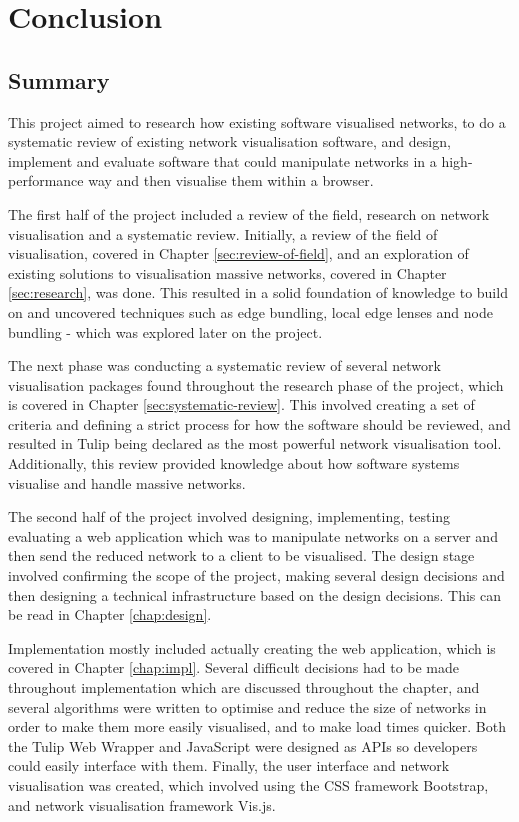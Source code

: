 \documentclass[../dissertation.tex]{subfiles}
\begin{document}
\chapter{Conclusion}

\section{Summary}

This project aimed to research how existing software visualised networks, to do a systematic review of existing network visualisation software, and design, implement and evaluate software that could manipulate networks in a high-performance way and then visualise them within a browser. 

The first half of the project included a review of the field, research on network visualisation and a systematic review. Initially, a review of the field of visualisation, covered in Chapter \ref{sec:review-of-field}, and an exploration of existing solutions to visualisation massive networks, covered in Chapter \ref{sec:research}, was done. This resulted in a solid foundation of knowledge to build on and uncovered techniques such as edge bundling, local edge lenses and node bundling - which was explored later on the project.

The next phase was conducting a systematic review of several network visualisation packages found throughout the research phase of the project, which is covered in Chapter \ref{sec:systematic-review}. This involved creating a set of criteria and defining a strict process for how the software should be reviewed, and resulted in Tulip being declared as the most powerful network visualisation tool. Additionally, this review provided knowledge about how software systems visualise and handle massive networks.

The second half of the project involved designing, implementing, testing evaluating a web application which was to manipulate networks on a server and then send the reduced network to a client to be visualised. The design stage involved confirming the scope of the project, making several design decisions and then designing a technical infrastructure based on the design decisions. This can be read in Chapter \ref{chap:design}.

Implementation mostly included actually creating the web application, which is covered in Chapter \ref{chap:impl}. Several difficult decisions had to be made throughout implementation which are discussed throughout the chapter, and several algorithms were written to optimise and reduce the size of networks in order to make them more easily visualised, and to make load times quicker. Both the Tulip Web Wrapper and JavaScript were designed as APIs so developers could easily interface with them. Finally, the user interface and network visualisation was created, which involved using the CSS framework Bootstrap, and network visualisation framework Vis.js. 
\end{document}
